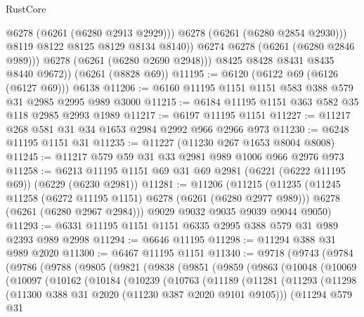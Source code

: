 \begin{lexlean}{RustCore}
\begin{coremodule}
                    @6278
                    (@6261 (@6280 @2913 @2929)))
                  @6278
                  (@6261 (@6280 @2854 @2930)))
                @8119
                @8122
                @8125
                @8129
                @8134
                @8140))
            @6274
            @6278
            (@6261 (@6280 @2846 @989)))
          @6278
          (@6261 (@6280 @2690 @2948)))
        @8425
        @8428
        @8431
        @8435
        @8440
        @9672))
    (@6261 (@8828 @69))
@11195 := @6120 (@6122 @69 (@6126 (@6127 @69))) @6138
@11206 := @6160 @11195 @1151 @1151 @583 @388 @579 @31 @2985 @2995 @989 @3000
@11215 := @6184 @11195 @1151 @363 @582 @35 @118 @2985 @2993 @1989
@11217 := @6197 @11195 @1151
@11227 := @11217 @268 @581 @31 @34 @1653 @2984 @2992 @966 @2966 @973
@11230 := @6248 @11195 @1151 @31
@11235 := @11227 (@11230 @267 @1653 @8004 @8008)
@11245 := @11217 @579 @59 @31 @33 @2981 @989 @1006 @966 @2976 @973
@11258 := @6213 @11195 @1151 @69 @31 @69 @2981 (@6221 (@6222 @11195 @69)) (@6229 (@6230 @2981))
@11281 := @11206
    (@11215
      (@11235
        (@11245 @11258 (@6272 @11195 @1151) @6278 (@6261 (@6280 @2977 @989)))
        @6278
        (@6261 (@6280 @2967 @2984)))
      @9029
      @9032
      @9035
      @9039
      @9044
      @9050)
@11293 := @6331 @11195 @1151 @1151 @6335 @2995 @388 @579 @31 @989 @2393 @989 @2998
@11294 := @6646 @11195
@11298 := @11294 @388 @31 @989 @2020
@11300 := @6467 @11195 @1151
@11340 := @9718
    (@9743
      (@9784
        (@9786
          (@9788
            (@9805
              (@9821
                (@9838
                  (@9851
                    (@9859
                      (@9863
                        (@10048
                          (@10069
                            (@10097
                              (@10162
                                (@10184
                                  (@10239
                                    (@10763
                                      (@11189
                                        (@11281
                                          (@11293
                                            (@11298
                                              (@11300
                                                @388
                                                @31
                                                @2020
                                                (@11230 @387 @2020 @9101 @9105)))
                                            (@11294
                                              @579
                                              @31

\end{coremodule}
\end{lexlean}

